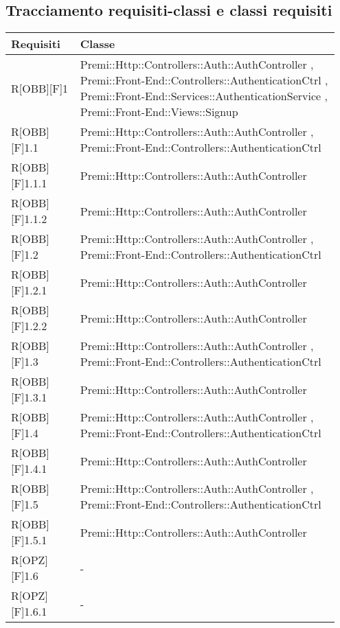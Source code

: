\newpage
\subsection{Tracciamento requisiti-classi e classi requisiti}
\begin{table}[h]
	\begin{center}
		\begin{tabular}{|p{0.2\linewidth}|p{0.75\linewidth}|}
			\toprule
			\textbf{Requisiti} & \textbf{Classe}\\
		\midrule
			R[OBB][F]1 & Premi::Http::Controllers::Auth::AuthController , Premi::Front-End::Controllers::AuthenticationCtrl , Premi::Front-End::Services::AuthenticationService , Premi::Front-End::Views::Signup\\
		\midrule
			R[OBB][F]1.1 & Premi::Http::Controllers::Auth::AuthController , Premi::Front-End::Controllers::AuthenticationCtrl\\
		\midrule
			R[OBB][F]1.1.1 & Premi::Http::Controllers::Auth::AuthController\\
		\midrule
			R[OBB][F]1.1.2 & Premi::Http::Controllers::Auth::AuthController\\
		\midrule
			R[OBB][F]1.2 & Premi::Http::Controllers::Auth::AuthController , Premi::Front-End::Controllers::AuthenticationCtrl\\
		\midrule
			R[OBB][F]1.2.1 & Premi::Http::Controllers::Auth::AuthController\\
		\midrule
			R[OBB][F]1.2.2 & Premi::Http::Controllers::Auth::AuthController\\
		\midrule
			R[OBB][F]1.3 & Premi::Http::Controllers::Auth::AuthController , Premi::Front-End::Controllers::AuthenticationCtrl\\
		\midrule
			R[OBB][F]1.3.1 & Premi::Http::Controllers::Auth::AuthController\\
		\midrule
			R[OBB][F]1.4 & Premi::Http::Controllers::Auth::AuthController , Premi::Front-End::Controllers::AuthenticationCtrl\\
		\midrule
			R[OBB][F]1.4.1 & Premi::Http::Controllers::Auth::AuthController\\
		\midrule
			R[OBB][F]1.5 & Premi::Http::Controllers::Auth::AuthController , Premi::Front-End::Controllers::AuthenticationCtrl\\
		\midrule
			R[OBB][F]1.5.1 & Premi::Http::Controllers::Auth::AuthController\\
		\midrule
			R[OPZ][F]1.6 & -\\
		\midrule
			R[OPZ][F]1.6.1 & -\\

\end{tabular}
\end{center}
\end{table}
